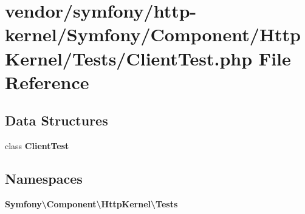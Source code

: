 \section{vendor/symfony/http-\/kernel/\+Symfony/\+Component/\+Http\+Kernel/\+Tests/\+Client\+Test.php File Reference}
\label{_client_test_8php}
\subsection*{Data Structures}
\begin{DoxyCompactItemize}
\item 
class {\bf Client\+Test}
\end{DoxyCompactItemize}
\subsection*{Namespaces}
\begin{DoxyCompactItemize}
\item 
 {\bf Symfony\textbackslash{}\+Component\textbackslash{}\+Http\+Kernel\textbackslash{}\+Tests}
\end{DoxyCompactItemize}
